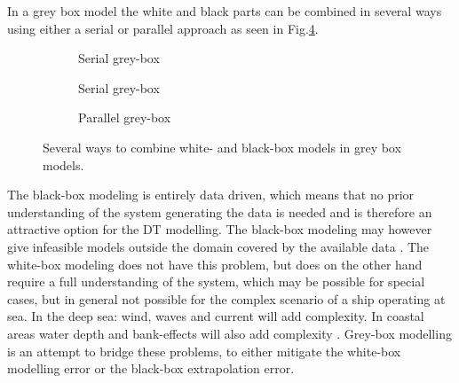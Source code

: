 \noindent In a grey box model the white and black parts can be combined in several ways using either a serial or parallel approach \cite{leifsson_grey-box_2008} as seen in Fig.\ref{fig:greycombinations}. 

\begin{figure}[H]
    \centering
    \begin{subfigure}[b]{0.3\textwidth}
    \centering
    \caption{Serial grey-box}
    \label{fig:serial1}
    \end{subfigure}

    
    \begin{subfigure}[b]{0.3\textwidth}
    \centering
    \caption{Serial grey-box}
    \label{fig:serial2}
    \end{subfigure}

    \begin{subfigure}[b]{0.3\textwidth}
    \centering
    \caption{Parallel grey-box}
    \label{fig:parallel}
    \end{subfigure}
    \caption{Several ways to combine white- and black-box models in grey box models.}
    \label{fig:greycombinations}
\end{figure}

\noindent The black-box modeling is entirely data driven, which means that no prior understanding of the system generating the data is needed and is therefore an attractive option for the DT modelling. The black-box modeling may however give infeasible models outside the domain covered by the available data \cite{nielsen_machine_2022}. The white-box modeling does not have this problem, but does on the other hand require a full understanding of the system, which may be possible for special cases, but in general not possible for the complex scenario of a ship operating at sea. In the deep sea: wind, waves and current will add complexity. In coastal areas water depth and bank-effects will also add complexity \cite{nielsen_machine_2022}. 
\noindent Grey-box modelling is an attempt to bridge these problems, to either mitigate the white-box modelling error or the black-box extrapolation error.

